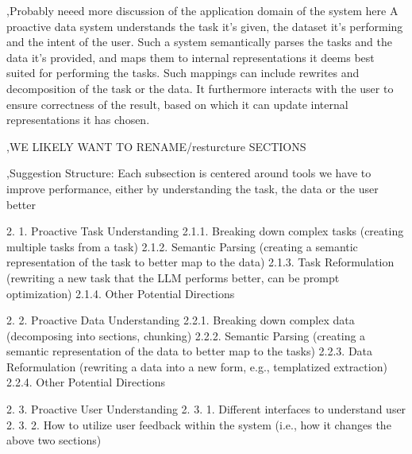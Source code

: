 




\sep{Probably neeed more discussion of the application domain of the system here}
A proactive data system understands the task it's given, the dataset it's performing and the intent of the user. Such a system semantically parses the tasks and the data it's provided, and maps them to internal representations it deems best suited for performing the tasks. Such mappings can include rewrites and decomposition of the task or the data. It furthermore interacts with the user to ensure correctness of the result, based on which it can update internal representations it has chosen. 


\sep{WE LIKELY WANT TO RENAME/resturcture SECTIONS}
\fi



\sep{Suggestion Structure:}
Each subsection is centered around tools we have to improve performance, either by understanding the task, the data or the user better

2. 1. Proactive Task Understanding 
2.1.1. Breaking down complex tasks (creating multiple tasks from a task)
2.1.2. Semantic Parsing (creating a semantic representation of the task to better map to the data)
2.1.3. Task Reformulation (rewriting a new task that the LLM performs better, can be prompt optimization)
2.1.4. Other Potential Directions

2. 2. Proactive Data Understanding 
2.2.1. Breaking down complex data (decomposing into sections, chunking)
2.2.2. Semantic Parsing (creating a semantic representation of the data to better map to the tasks)
2.2.3. Data Reformulation (rewriting a data into a new form, e.g., templatized extraction)
2.2.4. Other Potential Directions

2. 3. Proactive User Understanding 
2. 3. 1. Different interfaces to understand user 
2. 3. 2. How to utilize user feedback within the system (i.e., how it changes the above two sections) 
\fi








